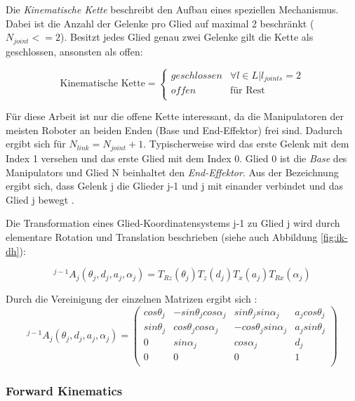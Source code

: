 Die \textit{Kinematische Kette} beschreibt den Aufbau eines speziellen Mechanismus. Dabei ist die Anzahl der Gelenke pro Glied auf maximal 2 beschränkt ($N_{joint} <= 2$). Besitzt jedes Glied genau zwei Gelenke gilt die Kette als geschlossen, ansonsten als offen:

\begin{equation}
	 \text{Kinematische Kette} = 
	\begin{cases}
		geschlossen & \forall l \in L | l_{joints} = 2 \\
		offen & \text{für Rest} \\
	\end{cases}
\end{equation}

Für diese Arbeit ist nur die offene Kette interessant, da die Manipulatoren der meisten Roboter an beiden Enden (Base und End-Effektor) frei sind. Dadurch ergibt sich für $N_{link} = N_{joint} + 1$. Typischerweise wird das erste Gelenk mit dem Index 1 versehen und das erste Glied mit dem Index 0. Glied 0 ist die \textit{Base} des Manipulators und Glied N beinhaltet den \textit{End-Effektor}. Aus der Bezeichnung ergibt sich, dass Gelenk j die Glieder j-1 und j mit einander verbindet und das Glied j bewegt \citep{Corke2011}. 

Die Transformation eines Glied-Koordinatensystems {j-1} zu Glied {j} wird durch elementare Rotation und Translation beschrieben (siehe auch Abbildung \ref{fig:ik-dh}):

\begin{equation}
^{j-1}A_{j}(\theta_j,d_j,a_j,\alpha_j) = T_{Rz}(\theta_j)T_{z}(d_j)T_{x}(a_j)T_{Rx}(\alpha_j)
\label{f:basics-ik-k}
\end{equation}


Durch die Vereinigung der einzelnen Matrizen ergibt sich \citep{Corke2011}:
\begin{equation}
^{j-1}A_{j}(\theta_j,d_j,a_j,\alpha_j) = 
\begin{pmatrix}
cos \theta_j & -sin \theta_j cos \alpha_j & sin \theta_j sin \alpha_j  & a_j cos \theta_j\\
sin \theta_j & cos \theta_j cos \alpha_j & -cos \theta_j sin \alpha_j  & a_j sin\theta_j\\
0 			&sin \alpha_j 				& cos \alpha_j  & d_j\\
0 & 0 & 0& 1\\
\end{pmatrix}
\end{equation}

\subsubsection{Forward Kinematics}

